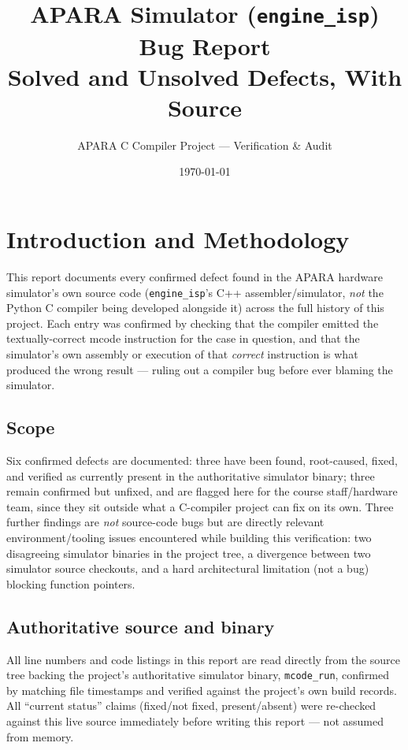 \documentclass[11pt,a4paper]{report}
\title{\textbf{APARA Simulator (\texttt{engine\_isp}) Bug Report \\ Solved and Unsolved Defects, With Source}}
\author{APARA C Compiler Project --- Verification \& Audit}
\date{\today}
\begin{document}
\maketitle
\tableofcontents

\chapter{Introduction and Methodology}

This report documents every confirmed defect found in the APARA hardware simulator's own
source code (\texttt{engine\_isp}'s C++ assembler/simulator, \emph{not} the Python C
compiler being developed alongside it) across the full history of this project. Each entry
was confirmed by checking that the compiler emitted the textually-correct mcode instruction
for the case in question, and that the simulator's own assembly or execution of that
\emph{correct} instruction is what produced the wrong result --- ruling out a compiler bug
before ever blaming the simulator.

\section{Scope}
Six confirmed defects are documented: three have been found, root-caused, fixed, and
verified as currently present in the authoritative simulator binary; three remain
confirmed but unfixed, and are flagged here for the course staff/hardware team, since they
sit outside what a C-compiler project can fix on its own. Three further findings are
\emph{not} source-code bugs but are directly relevant environment/tooling issues
encountered while building this verification: two disagreeing simulator binaries in the
project tree, a divergence between two simulator source checkouts, and a hard
architectural limitation (not a bug) blocking function pointers.

\section{Authoritative source and binary}
All line numbers and code listings in this report are read directly from the source tree
backing the project's authoritative simulator binary, \texttt{mcode\_run}, confirmed by
matching file timestamps and verified against the project's own build records. All
``current status'' claims (fixed/not fixed, present/absent) were re-checked against this
live source immediately before writing this report --- not assumed from memory.
\end{document}
